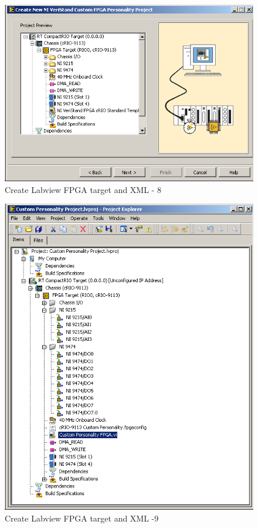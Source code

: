 \documentclass[a4paper,english]{report}
\begin{document}
\begin{figure}[htb!]
	\centering \includegraphics[scale=0.45]{Screenshots/Screenshot_2015-01-16_19-25-54.png}
	\caption{Create Labview FPGA target and XML - 8}
	\label{fig: Create Labview FPGA target and XML-8} 
\end{figure}
\begin{figure}[htb!]
	\centering \includegraphics[scale=0.45]{Screenshots/Screenshot_2015-01-16_19-28-17.png}
	\caption{Create Labview FPGA target and XML -9}
	\label{fig: Create Labview FPGA target and XML-9} 
\end{figure}
\end{document}
